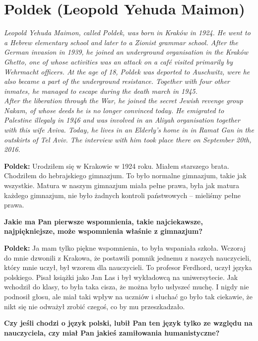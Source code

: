 \section{Poldek (Leopold Yehuda Maimon)}
\begin{otherlanguage}{polish}
\textit{Leopold Yehuda Maimon, called Poldek, was born in Kraków in 1924. He went to a Hebrew elementary school and later to a Zionist grammar school. After the German invasion in 1939, he joined an underground organisation in the Kraków Ghetto, one of whose activities was an attack on a café visited primarily by Wehrmacht officers. At the age of 18, Poldek was deported to Auschwitz, were he also became a part of the underground resistance. Together with four other inmates, he managed to escape during the death march in 1945.\\
After the liberation through the War, he joined the secret Jewish revenge group Nakam, of whose deeds he is no longer convinced today. He emigrated to Palestine illegaly in 1946 and was involved in an Aliyah organisation together with this wife Aviva. Today, he lives in an Elderly’s home in in Ramat Gan in the outskirts of Tel Aviv. The interview with him took place there on September 20th, 2016.}\par
\vspace*{2em}
\textbf{Poldek:}  Urodziłem się w Krakowie w 1924 roku. Miałem starszego brata. Chodziłem do hebrajskiego gimnazjum. To było normalne gimnazjum, takie jak wszystkie. Matura w naszym gimnazjum miała pełne prawa, była jak matura każdego gimnazjum, nie było żadnych kontroli państwowych – mieliśmy pełne prawa.

\textbf{Jakie ma Pan pierwsze wspomnienia, takie najciekawsze, najpiękniejsze, może wspomnienia właśnie z gimnazjum?}

\textbf{Poldek:} Ja mam tylko piękne wspomnienia, to była wspaniała szkoła. Wczoraj do mnie dzwonili z Krakowa, że postawili pomnik jednemu z naszych nauczycieli, który mnie uczył, był wzorem dla nauczycieli. To profesor Ferdhord, uczył języka polskiego. Pisał książki jako Jan Las i był wykładowcą na uniwersytecie. Jak wchodził do klasy, to była taka cisza, że można było usłyszeć muchę. I nigdy nie podnosił głosu, ale miał taki wpływ na uczniów i słuchać go było tak ciekawie, że nikt się nie odważył zrobić czegoś, co by mu przeszkadzało. 

\textbf{Czy jeśli chodzi o język polski, lubił Pan ten język tylko ze względu na nauczyciela, czy miał Pan jakieś zamiłowania humanistyczne?}
 

\end{otherlanguage}
